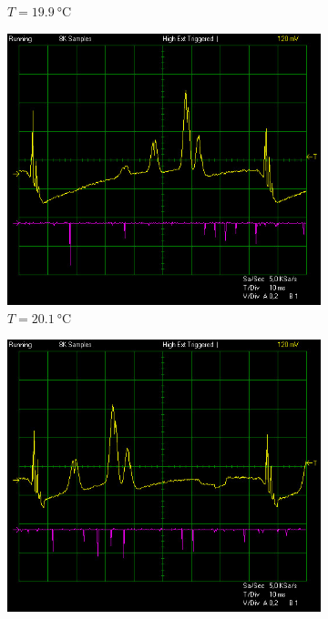 \documentclass{article}
\begin{document}
\begin{figure}[h]
\begin{subfigure}[b]{0.3\textwidth}
        \caption{$T = \SI{19.9}{\celsius}$}
        \label{fig:199C}
    \end{subfigure}
    \begin{subfigure}[b]{0.3\textwidth}
        \includegraphics[width=\textwidth]{Figures/2/Iconst118mA/201.jpg}
        \caption{$T = \SI{20.1}{\celsius}$}
        \label{fig:201C}
    \end{subfigure}
    \begin{subfigure}[b]{0.3\textwidth}
        \includegraphics[width=\textwidth]{Figures/2/Iconst118mA/202.jpg}

\end{subfigure}
\end{figure}
\end{document}
